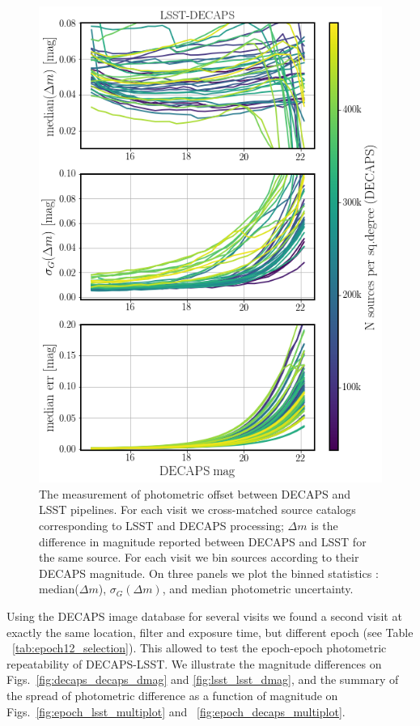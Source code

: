 \documentclass[DM,lsstdraft,toc,usenatbib]{lsstdoc}
\begin{document}
\begin{figure}
\begin{centering}
\includegraphics[width=0.7\columnwidth]{figs/decaps_lsst_rms_plot.png}
\caption{The measurement of photometric offset between DECAPS and LSST pipelines. For each visit we cross-matched source catalogs corresponding to LSST and DECAPS processing; $\Delta m$ is the difference in magnitude reported between DECAPS and LSST for the same source. For each visit we bin sources according to their DECAPS magnitude. On three panels we plot the binned statistics : median($\Delta m$),  $\sigma_{G}(\Delta m)$, and median photometric uncertainty.}
\label{fig:lsst_decaps_dmag}
\end{centering}
\end{figure} 



Using the DECAPS image database for several visits we found a second visit at exactly the same location, filter and exposure time, but different epoch (see Table ~\ref{tab:epoch12_selection}).  This allowed to test the epoch-epoch photometric repeatability of DECAPS-LSST. We illustrate the  magnitude differences on Figs.~\ref{fig:decaps_decaps_dmag} and \ref{fig:lsst_lsst_dmag}, and the summary of the spread of photometric difference as a function of magnitude on Figs.~\ref{fig:epoch_lsst_multiplot} and ~\ref{fig:epoch_decaps_multiplot}. 
\end{document}
